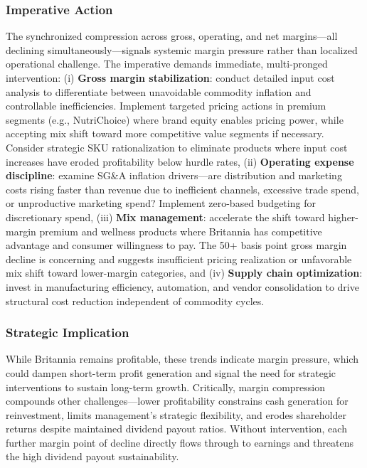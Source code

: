 \documentclass[12pt, a4paper]{report}
\begin{document}
\subsubsection{Imperative Action}
The synchronized compression across gross, operating, and net margins—all declining simultaneously—signals systemic margin pressure rather than localized operational challenge. The imperative demands immediate, multi-pronged intervention: (i) \textbf{Gross margin stabilization}: conduct detailed input cost analysis to differentiate between unavoidable commodity inflation and controllable inefficiencies. Implement targeted pricing actions in premium segments (e.g., NutriChoice) where brand equity enables pricing power, while accepting mix shift toward more competitive value segments if necessary. Consider strategic SKU rationalization to eliminate products where input cost increases have eroded profitability below hurdle rates, (ii) \textbf{Operating expense discipline}: examine SG\&A inflation drivers—are distribution and marketing costs rising faster than revenue due to inefficient channels, excessive trade spend, or unproductive marketing spend? Implement zero-based budgeting for discretionary spend, (iii) \textbf{Mix management}: accelerate the shift toward higher-margin premium and wellness products where Britannia has competitive advantage and consumer willingness to pay. The 50+ basis point gross margin decline is concerning and suggests insufficient pricing realization or unfavorable mix shift toward lower-margin categories, and (iv) \textbf{Supply chain optimization}: invest in manufacturing efficiency, automation, and vendor consolidation to drive structural cost reduction independent of commodity cycles.

\subsubsection{Strategic Implication}
While Britannia remains profitable, these trends indicate margin pressure, which could dampen short-term profit generation and signal the need for strategic interventions to sustain long-term growth. Critically, margin compression compounds other challenges—lower profitability constrains cash generation for reinvestment, limits management's strategic flexibility, and erodes shareholder returns despite maintained dividend payout ratios. Without intervention, each further margin point of decline directly flows through to earnings and threatens the high dividend payout sustainability.
\end{document}
